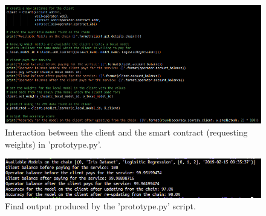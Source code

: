 \begin{figure}[H]
\centering
  \includegraphics[scale = .55]{imgs/prototype_2.png}
  \caption{Interaction between the client and the smart contract (requesting weights) in 'prototype.py'.}
  \label{fig:prototype_2}
\end{figure}

\begin{figure}[H]
\centering
  \includegraphics[scale = .65]{imgs/prototype_3.png}
  \caption{Final output produced by the 'prototype.py' script.}
  \label{fig:prototype_3}
\end{figure}

